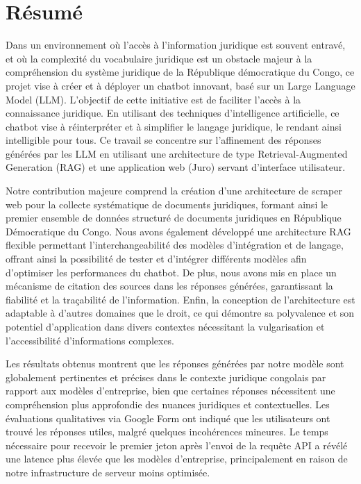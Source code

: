 
\renewcommand{\abstractname}{Résumé} %

\begingroup
\let\clearpage\relax
\let\cleardoublepage\relax
\let\cleardoublepage\relax

\chapter*{Résumé}
Dans un environnement où l'accès à l'information juridique est souvent entravé, et où la complexité du vocabulaire juridique est un obstacle majeur à la compréhension du système juridique de la République démocratique du Congo, ce projet vise à créer et à déployer un chatbot innovant, basé sur un Large Language Model (LLM). L'objectif de cette initiative est de faciliter l'accès à la connaissance juridique. En utilisant des techniques d'intelligence artificielle, ce chatbot vise à réinterpréter et à simplifier le langage juridique, le rendant ainsi intelligible pour tous. Ce travail se concentre sur l'affinement des réponses générées par les LLM en utilisant une architecture de type Retrieval-Augmented Generation (RAG) et une application web (Juro) servant d'interface utilisateur.

Notre contribution majeure comprend la création d'une architecture de scraper web pour la collecte systématique de documents juridiques, formant ainsi le premier ensemble de données structuré de documents juridiques en République Démocratique du Congo. Nous avons également développé une architecture RAG flexible permettant l'interchangeabilité des modèles d'intégration et de langage, offrant ainsi la possibilité de tester et d'intégrer différents modèles afin d'optimiser les performances du chatbot. De plus, nous avons mis en place un mécanisme de citation des sources dans les réponses générées, garantissant la fiabilité et la traçabilité de l'information. Enfin, la conception de l'architecture est adaptable à d'autres domaines que le droit, ce qui démontre sa polyvalence et son potentiel d'application dans divers contextes nécessitant la vulgarisation et l'accessibilité d'informations complexes.

Les résultats obtenus montrent que les réponses générées par notre modèle sont globalement pertinentes et précises dans le contexte juridique congolais par rapport aux modèles d'entreprise, bien que certaines réponses nécessitent une compréhension plus approfondie des nuances juridiques et contextuelles. Les évaluations qualitatives via Google Form ont indiqué que les utilisateurs ont trouvé les réponses utiles, malgré quelques incohérences mineures. Le temps nécessaire pour recevoir le premier jeton après l'envoi de la requête API a révélé une latence plus élevée que les modèles d'entreprise, principalement en raison de notre infrastructure de serveur moins optimisée.

